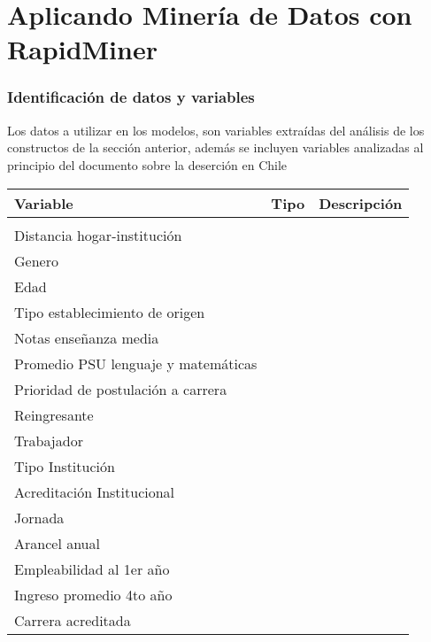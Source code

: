 \chapter[Aplicando Minería de Datos con RapidMiner]{Aplicando Minería de Datos con RapidMiner}
\label{ch:desmin}
\subsection{Identificación de datos y variables}

Los datos a utilizar en los modelos, son variables extraídas del análisis de los constructos de la sección anterior, además se incluyen variables analizadas al principio del documento sobre la deserción en Chile

\begin{table}[H]
	\begin{center}
		\begin{tabular}{|l|l|l|}
			\hline
			Variable & Tipo & Descripción \\
			\hline \hline
			&  & \\ \hline
			Distancia hogar-institución &  & \\ \hline
			Genero &  & \\ \hline
			Edad &  & \\ \hline
			Tipo establecimiento de origen &  & \\ \hline
			Notas enseñanza media & & \\ \hline
			Promedio PSU lenguaje y matemáticas &  & \\ \hline
			Prioridad de postulación a carrera & & \\ \hline
			Reingresante & & \\ \hline
			Trabajador & & \\ \hline
			\hline \hline
			
			Tipo Institución &  & \\ \hline
			Acreditación Institucional &  & \\ \hline
			Jornada &  & \\ \hline
			Arancel anual & & \\ \hline
			Empleabilidad al 1er año & & \\ \hline
			Ingreso promedio 4to año & & \\ \hline
			Carrera acreditada & & \\ \hline
			\hline \hline
			

\end{tabular}
\end{center}
\end{table}
